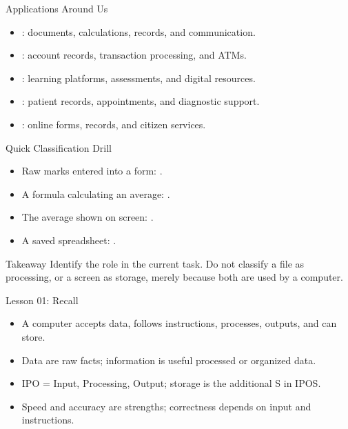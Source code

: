 \documentclass[aspectratio=169]{beamer}
\begin{document}
\begin{frame}{Applications Around Us}
  \begin{itemize}
    \item {}: documents, calculations, records, and communication.
    \item {}: account records, transaction processing, and ATMs.
    \item {}: learning platforms, assessments, and digital
      resources.
    \item {}: patient records, appointments, and diagnostic
      support.
    \item {}: online forms, records, and citizen services.
  \end{itemize}
  \vspace{0.3cm}
\end{frame}

\begin{frame}{Quick Classification Drill}
  \begin{itemize}
    \item Raw marks entered into a form: .
    \item A formula calculating an average: .
    \item The average shown on screen: .
    \item A saved spreadsheet: .
  \end{itemize}
  \begin{exampleblock}{Takeaway}
    Identify the role in the current task. Do not classify a file as
    processing, or a screen as storage, merely because both are used by a
    computer.
  \end{exampleblock}
\end{frame}

\begin{frame}{Lesson 01: Recall}
  \begin{itemize}
    \item A computer accepts data, follows instructions, processes, outputs,
      and can store.
    \item Data are raw facts; information is useful processed or organized
      data.
    \item IPO = Input, Processing, Output; storage is the additional S in
      IPOS.
    \item Speed and accuracy are strengths; correctness depends on input and
      instructions.
  \end{itemize}
\end{frame}
\end{document}

